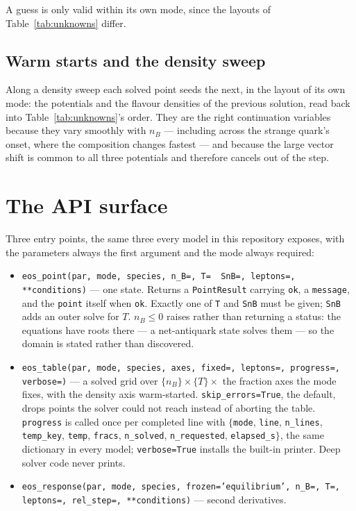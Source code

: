 \documentclass[aps,prc,onecolumn,superscriptaddress,nofootinbib,10pt]{revtex4-2}
\newcommand{\nB}{n_B}
\begin{document}
A guess is only valid within its own mode, since the layouts of
Table~\ref{tab:unknowns} differ.

\subsection{Warm starts and the density sweep}

Along a density sweep each solved point seeds the next, in the layout of its
own mode: the potentials and the flavour densities of the previous solution,
read back into Table~\ref{tab:unknowns}'s order. They are the right
continuation variables because they vary smoothly with $\nB$ --- including
across the strange quark's onset, where the composition changes fastest --- and
because the large vector shift is common to all three potentials and therefore
cancels out of the step.

\section{The API surface}
\label{sec:api}

Three entry points, the same three every model in this repository exposes,
with the parameters always the first argument and the mode always required:
%
\begin{itemize}
\item \texttt{eos\_point(par, mode, species, n\_B=, T= \textbar\ SnB=,
      leptons=, **conditions)} --- one state. Returns a \texttt{PointResult}
      carrying \texttt{ok}, a \texttt{message}, and the \texttt{point} itself
      when \texttt{ok}. Exactly one of \texttt{T} and \texttt{SnB} must be
      given; \texttt{SnB} adds an outer solve for $T$. $\nB \le 0$ raises
      rather than returning a status: the equations have roots there --- a
      net-antiquark state solves them --- so the domain is stated rather than
      discovered.
\item \texttt{eos\_table(par, mode, species, axes, fixed=, leptons=,
      progress=, verbose=)} --- a solved grid over
      $\{\nB\} \times \{T\} \times$ the fraction axes the mode fixes, with the
      density axis warm-started. \texttt{skip\_errors=True}, the default,
      drops points the solver could not reach instead of aborting the table.
      \texttt{progress} is called once per completed line with
      $\{$\texttt{mode}, \texttt{line}, \texttt{n\_lines}, \texttt{temp\_key},
      \texttt{temp}, \texttt{fracs}, \texttt{n\_solved}, \texttt{n\_requested},
      \texttt{elapsed\_s}$\}$, the same dictionary in every model;
      \texttt{verbose=True} installs the built-in printer. Deep solver code
      never prints.
\item \texttt{eos\_response(par, mode, species, frozen='equilibrium', n\_B=,
      T=, leptons=, rel\_step=, **conditions)} --- second derivatives.
\end{itemize}
\end{document}
